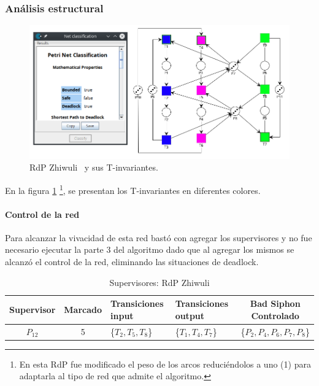 \subsubsection{Análisis estructural}
\hfill
\begin{figure}[H]
	\centering
	\includegraphics[width=\textwidth]{Figures/testing/zhiwuli_tinvariantes.png}
	\caption[RdP Zhiwuli y sus T-invariantes.]{RdP Zhiwuli \footnotemark \ y sus T-invariantes.}
	\label{fig:zhiwuli_tivariantes}
 \end{figure} 

En la figura \ref{fig:zhiwuli_tivariantes} \footnote{En esta RdP fue modificado el peso de los arcos reduciéndolos a uno (1) para adaptarla al tipo de red que admite el algoritmo.}, se presentan los T-invariantes en diferentes colores. \\

\paragraph{Control de la red}
\hfill \break
Para alcanzar la vivacidad de esta red bastó con agregar los supervisores y no fue necesario ejecutar la parte 3 del algoritmo dado que al agregar los mismos se alcanzó el control de la red, eliminando las situaciones de deadlock.

\bigskip
\begin{table}[H]
    \small
    \centering
    \begin{tabular}{|c|c|P{2cm}|P{2.3cm}|c|}
    \hline
    \textbf{Supervisor} & \textbf{Marcado} & \textbf{Transiciones input} & \textbf{Transiciones output} & \textbf{Bad Siphon Controlado}  \\  \hline
    $P_{12}$ & 5 & \{$T_{2}, T_5, T_{8}$\} &  \{$T_{1},T_{4}, T_7$\} & \{$P_2, P_4, P_6, P_7, P_8$\} \\ 
    \hline
    \end{tabular}
    \caption{Supervisores: RdP Zhiwuli}
    \label{tab:Zhiwuli}
\end{table}
\hfill


